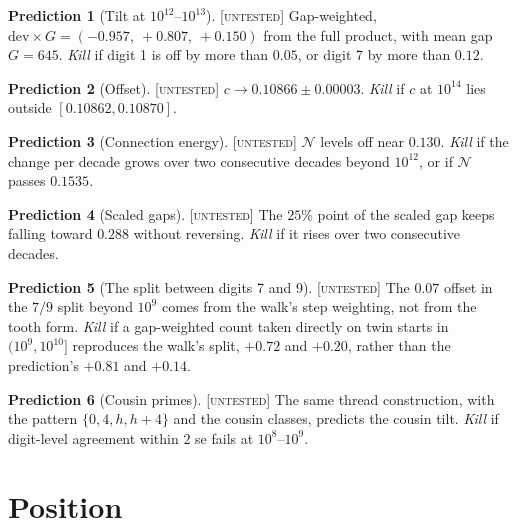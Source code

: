 \documentclass[11pt]{article}
\theoremstyle{definition}
\newtheorem{prediction}{Prediction}
\theoremstyle{remark}
\newcommand{\grade}[1]{\textsc{[#1]}}
\begin{document}
\begin{prediction}[Tilt at $10^{12}$--$10^{13}$] \grade{untested}
Gap-weighted, $\mathrm{dev}\times G=(-0.957,\ +0.807,\ +0.150)$ from the full product, with mean gap $G=645$.
\emph{Kill} if digit 1 is off by more than $0.05$, or digit 7 by more than $0.12$.
\end{prediction}

\begin{prediction}[Offset] \grade{untested}
$c\to0.10866\pm0.00003$.
\emph{Kill} if $c$ at $10^{14}$ lies outside $[0.10862, 0.10870]$.
\end{prediction}

\begin{prediction}[Connection energy] \grade{untested}
$\mathcal N$ levels off near $0.130$.
\emph{Kill} if the change per decade grows over two consecutive decades beyond $10^{12}$, or if $\mathcal N$ passes $0.1535$.
\end{prediction}

\begin{prediction}[Scaled gaps] \grade{untested}
The $25\%$ point of the scaled gap keeps falling toward $0.288$ without reversing.
\emph{Kill} if it rises over two consecutive decades.
\end{prediction}

\begin{prediction}[The split between digits 7 and 9]\label{pr:split} \grade{untested}
The $0.07$ offset in the $7/9$ split beyond $10^9$ comes from the walk's step weighting, not from the tooth form.
\emph{Kill} if a gap-weighted count taken directly on twin starts in $(10^9,10^{10}]$ reproduces the walk's split, $+0.72$ and $+0.20$, rather than the prediction's $+0.81$ and $+0.14$.
\end{prediction}

\begin{prediction}[Cousin primes] \grade{untested}
The same thread construction, with the pattern $\{0,4,h,h+4\}$ and the cousin classes, predicts the cousin tilt.
\emph{Kill} if digit-level agreement within $2$ se fails at $10^8$--$10^9$.
\end{prediction}

\section{Position}
\end{document}
